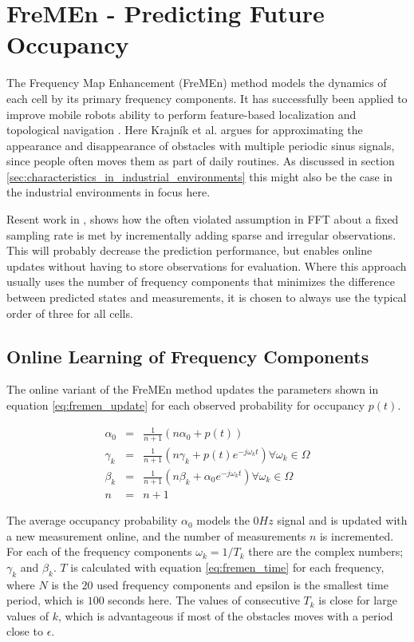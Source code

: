 \section{FreMEn - Predicting Future Occupancy}
\label{sec:fremen}
The  Frequency Map Enhancement (FreMEn) method models the dynamics of each cell by its primary frequency components. 
It has successfully been applied to improve mobile robots ability to perform feature-based localization \cite{online_fremen} and topological navigation \cite{fentanes2015}. 
Here Krajník et al. argues for approximating the appearance and disappearance of obstacles with multiple periodic sinus signals, since people often moves them as part of daily routines. 
As discussed in section \ref{sec:characteristics_in_industrial_environments} this might also be the case in the industrial environments in focus here. 

Resent work in \cite{life_long_exploration}, shows how the often violated assumption in FFT about a fixed sampling rate is met by incrementally adding sparse and irregular observations. 
This will probably decrease the prediction performance, but enables online updates without having to store observations for evaluation. 
Where this approach usually uses the number of frequency components that minimizes the difference between predicted states and measurements, it is chosen to always use the typical order of three \cite{life_long_exploration} for all cells.

\subsection{Online Learning of Frequency Components}
The online variant of the FreMEn method updates the parameters shown in equation \ref{eq:fremen_update} for each  observed probability for occupancy $p(t)$. 

\begin{eqnarray}
\alpha_0 &=& \frac{1}{n+1}(n \alpha_0 + p(t)) \nonumber \\ 
\gamma_k &=& \frac{1}{n+1}(n \gamma_k + p(t) e^{-j \omega_k t}) \forall \omega_k \in \Omega  \\
\beta_k &=& \frac{1}{n+1}(n \beta_k + \alpha_0 e^{-j \omega_k t}) \forall \omega_k \in \Omega \nonumber \\
n &=& n + 1 \nonumber
\label{eq:fremen_update}
\end{eqnarray}

The average occupancy probability $\alpha_0$ models the $0Hz$ signal and is updated with a new measurement online, and the number of measurements $n$ is incremented. 
For each of the frequency components $\omega_k=1/T_k$ there are the complex numbers; $\gamma_k$ and $\beta_k$.
$T$ is calculated with equation \ref{eq:fremen_time} for each frequency, where $N$ is the $20$ used frequency components and epsilon is the smallest time period, which is $100$ seconds here. 
The values of consecutive $T_k$ is close for large values of $k$, which is advantageous if most of the obstacles moves with a period close to $\epsilon$.

